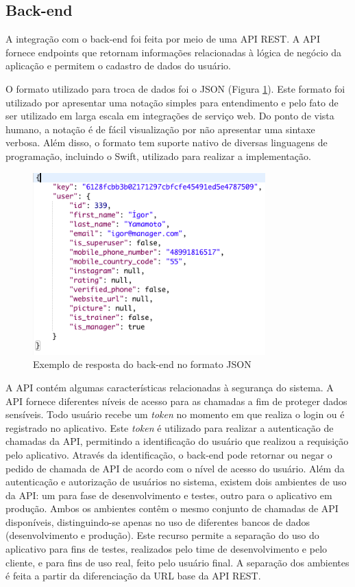 \subsection{Back-end}
A integração com o back-end foi feita por meio de uma API REST. A API fornece endpoints que retornam informações relacionadas à lógica de negócio da aplicação e permitem o cadastro de dados do usuário.

O formato utilizado para troca de dados foi o JSON (Figura \ref{fig:json}). Este formato foi utilizado por apresentar uma notação simples para entendimento e pelo fato de ser utilizado em larga escala em integrações de serviço web. Do ponto de vista humano, a notação é de fácil visualização por não apresentar uma sintaxe verbosa. Além disso, o formato tem suporte nativo de diversas linguagens de programação, incluindo o Swift, utilizado para realizar a implementação.

\begin{figure}[H]
    \centering
    \includegraphics[width=0.8\textwidth]{pfc/figuras/json.png}
    \caption{Exemplo de resposta do back-end no formato JSON}
    \label{fig:json}
\end{figure}

A API contém algumas características relacionadas à segurança do sistema. A API fornece diferentes níveis de acesso para as chamadas a fim de proteger dados sensíveis. Todo usuário recebe um \textit{token} no momento em que realiza o login ou é registrado no aplicativo. Este \textit{token} é utilizado para realizar a autenticação de chamadas da API, permitindo a identificação do usuário que realizou a requisição pelo aplicativo. Através da identificação, o back-end pode retornar ou negar o pedido de chamada de API de acordo com o nível de acesso do usuário. Além da autenticação e autorização de usuários no sistema, existem dois ambientes de uso da API: um para fase de desenvolvimento e testes, outro para o aplicativo em produção. Ambos os ambientes contêm o mesmo conjunto de chamadas de API disponíveis, distinguindo-se apenas no uso de diferentes bancos de dados (desenvolvimento e produção). Este recurso permite a separação do uso do aplicativo para fins de testes, realizados pelo time de desenvolvimento e pelo cliente, e para fins de uso real, feito pelo usuário final. A separação dos ambientes é feita a partir da diferenciação da URL base da API REST.

